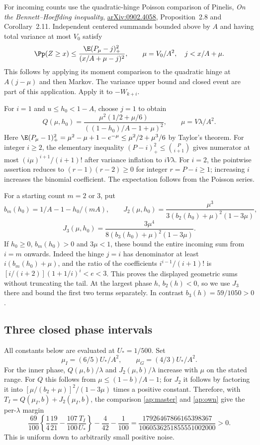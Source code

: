 For incoming counts use the quadratic-hinge Poisson comparison of
Pinelis, \emph{On the Bennett--Hoeffding inequality},
\href{https://arxiv.org/abs/0902.4058}{arXiv:0902.4058}, Proposition~2.8
and Corollary~2.11. Independent centered summands bounded above by $A$
and having total variance at most $V_0$ satisfy
\[
 \Pp(Z\ge x)\le\frac{\E(P_\mu-j)_+^2}{(x/A+\mu-j)^2},
 \qquad \mu=V_0/A^2,\quad j<x/A+\mu.
\]
This follows by applying its moment comparison to the quadratic hinge
at $A(j-\mu)$ and then Markov. The variance upper bound and closed
event are part of this application. Apply it to $-W_{k+i}$.

For $i=1$ and $u\le h_0<1-A$, choose $j=1$ to obtain
\[
 Q(\mu,h_0)=\frac{\mu^2(1/2+\mu/6)}{((1-h_0)/A-1+\mu)^2},
 \qquad \mu=V\lambda/A^2.
\]
Here $\E(P_\mu-1)_+^2=\mu^2-\mu+1-e^{-\mu}
\le\mu^2/2+\mu^3/6$ by Taylor's theorem.
For integer $i\ge2$, the elementary inequality
$(P-i)_+^2\le\binom P{i+1}$ gives numerator at most
$(i\mu)^{i+1}/(i+1)!$ after variance inflation to $iV\lambda$.
For $i=2$, the pointwise assertion reduces to
$(r-1)(r-2)\ge0$ for integer $r=P-i\ge1$; increasing $i$ increases
the binomial coefficient. The expectation follows from the Poisson series.

For a starting count $m=2$ or $3$, put
\[
 b_m(h_0)=1/A-1-h_0/(mA),\qquad
 J_2(\mu,h_0)=\frac{\mu^3}{3(b_2(h_0)+\mu)^2(1-3\mu)},
\]
\[
 J_3(\mu,h_0)=\frac{3\mu^4}{8(b_3(h_0)+\mu)^2(1-3\mu)}.
\]
If $h_0\ge0$, $b_m(h_0)>0$ and $3\mu<1$, these bound the entire
incoming sum from $i=m$ onwards. Indeed the hinge $j=i$ has denominator
at least $i(b_m(h_0)+\mu)$, and the ratio of the coefficients
$i^{i-1}/(i+1)!$ is $[i/(i+2)](1+1/i)^i<e<3$.
This proves the displayed geometric sums without truncating the tail.
At the largest phase $h$, $b_2(h)<0$, so we use $J_3$ there and bound
the first two terms separately. In contrast $b_3(h)=59/1050>0$.

\subsection{Three closed phase intervals}
All constants below are evaluated at $U_*=1/500$. Set
\[
 \mu_I=(6/5)U_*/A^2,\qquad \mu_G=(4/3)U_*/A^2.
\]
For the inner phase, $Q(\mu,b)/\lambda$ and $J_2(\mu,b)/\lambda$
increase with $\mu$ on the stated range. For $Q$ this follows from
$\mu\le(1-b)/A-1$; for $J_2$ it follows by factoring it into
$[\mu/(b_2+\mu)]^2/(1-3\mu)$ times a positive constant.
Therefore, with $T_I=Q(\mu_I,b)+J_2(\mu_I,b)$, the comparison
\eqref{ap:master} and \eqref{ap:own} give the per-$\lambda$ margin
\[
 \frac{69}{100}\left\{\frac14\frac{19}{21}
          -\frac{107}{100}\frac{T_I}{U_*}\right\}
   -\frac4{42}-\frac1{100}
          =\frac{17926467866165398367}{1060536251855551002000}>0.
\]
This is uniform down to arbitrarily small positive noise.

